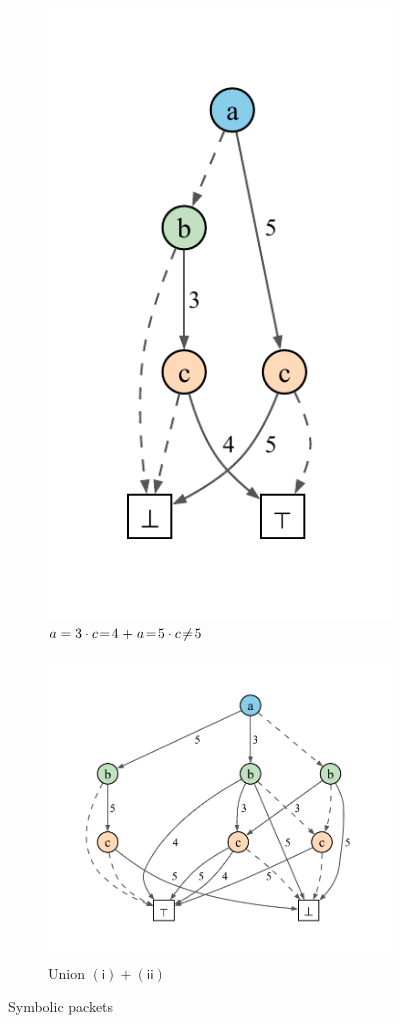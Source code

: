 \documentclass[acmsmall,dvipsnames,nonacm]{acmart}
\begin{document}
\begin{figure}
\begin{subfigure}[b]{0.29\textwidth}
        \includegraphics[scale=0.5]{viz/sp2.pdf}
        \caption{$a=3 \cdot c\mathrel{\!=\!}4 \mathrel{+} a\mathrel{\!=\!}5 \cdot c \mathrel{\!\neq\!} 5$}
        \label{fig:sp2}
    \end{subfigure}
    \hfill %
    \begin{subfigure}[b]{0.40\textwidth}
        \centering
        \includegraphics[scale=0.5]{viz/sp1cup2.pdf}
        \caption{Union $(\mathsf{i}) + (\mathsf{ii})$}
        \label{fig:sp1cup2}
    \end{subfigure}
    \caption{Symbolic packets}
    \label{fig:sympk}
\end{figure}
\end{document}

